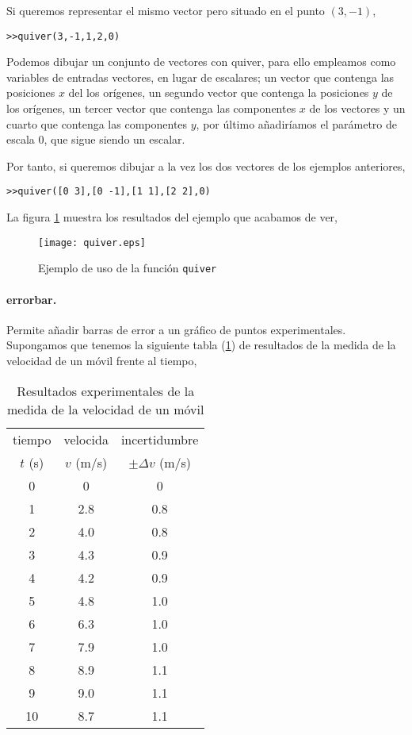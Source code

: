 Si queremos representar el mismo vector pero situado en el punto $(3,-1)$,
\begin{verbatim}
>>quiver(3,-1,1,2,0)
\end{verbatim}

Podemos dibujar un conjunto de vectores con quiver, para ello empleamos como variables de entradas vectores, en lugar de escalares; un vector que contenga las posiciones $x$ del los orígenes, un segundo vector que contenga la posiciones $y$ de los orígenes, un tercer vector que contenga las componentes $x$ de los vectores y un cuarto que contenga las componentes $y$, por último añadiríamos el parámetro de escala $0$, que sigue siendo un escalar.

Por tanto, si queremos dibujar a la vez los dos vectores de los ejemplos anteriores,

\begin{verbatim}
>>quiver([0 3],[0 -1],[1 1],[2 2],0)
\end{verbatim}

La figura \ref{fig:quiver} muestra los resultados del ejemplo que acabamos de ver,

\begin{figure}[h]
\centering
\texttt{[image: quiver.eps]}
\caption{Ejemplo de uso de la función \texttt{quiver}}
\label{fig:quiver}
\end{figure}

\paragraph{errorbar.} Permite añadir barras de  error a un gráfico de puntos experimentales. Supongamos que tenemos la siguiente tabla (\ref{vel}) de resultados de la medida de la velocidad de un móvil frente al tiempo,


\begin{table}[h]
\caption{Resultados experimentales de la medida de la velocidad de un móvil}
\centering
\begin{tabular}{ccc}
\hline
\hline
tiempo &velocida& incertidumbre\\ 
$t$ (s)&$v$ (m/s)& $\pm \Delta v$ (m/s)\\
\hline
0&0&0\\
1&2.8&0.8\\
2&4.0&0.8\\
3&4.3&0.9\\
4&4.2&0.9\\
5&4.8&1.0\\
6&6.3&1.0\\
7&7.9&1.0\\
8&8.9&1.1\\
9&9.0&1.1\\
10&8.7&1.1\\
\hline
\hline
\end{tabular}
\label{vel}
\end{table} 

